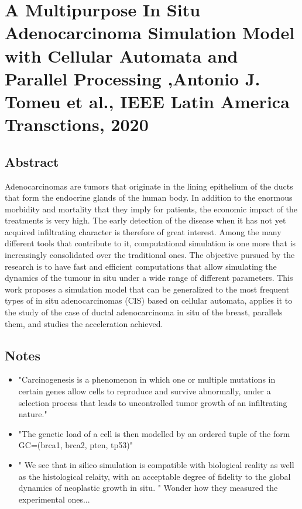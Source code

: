 \documentclass[11pt,a4paper]{article}
\begin{document}
\section*{A Multipurpose In Situ Adenocarcinoma Simulation Model with Cellular Automata and Parallel Processing ,Antonio J. Tomeu et al., IEEE Latin America Transctions, 2020}
\subsection*{Abstract}
Adenocarcinomas are tumors that originate in the lining epithelium of the ducts that form the endocrine glands of the human body. In addition to the enormous morbidity and mortality that they imply for patients, the economic impact of the treatments is very high. The early detection of the disease when it has not yet acquired infiltrating character is therefore of great interest. Among the many different tools that contribute to it, computational simulation is one more that is increasingly consolidated over the traditional ones. The objective pursued by the research is to have fast and efficient computations that allow simulating the dynamics of the tumour in situ under a wide range of different parameters. This work proposes a simulation model that can be generalized to the most frequent types of in situ adenocarcinomas (CIS) based on cellular automata, applies it to the study of the case of ductal adenocarcinoma in situ of the breast, parallels them, and studies the acceleration achieved.

\subsection*{Notes}
\begin{itemize}
\item "Carcinogenesis is a phenomenon in which one or multiple mutations in certain genes allow cells to reproduce and survive abnormally, under a selection process that leads to uncontrolled tumor growth of an infiltrating nature."
\item "The genetic load of a cell is then modelled by an ordered tuple of the form GC=(brca1, brca2, pten, tp53)"
\item" We see that in silico simulation is compatible with biological reality as well as the histological relaity, with an acceptable degree of fidelity to the global dynamics of neoplastic growth in situ. " Wonder how they measured the experimental ones...

\end{itemize}
\end{document}
